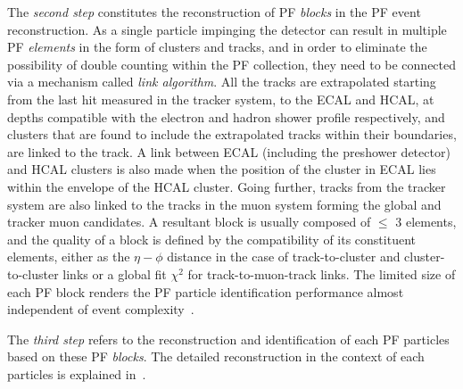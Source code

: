 The \emph{second step} constitutes the reconstruction of PF \emph{blocks} in the PF event reconstruction. As a single particle impinging the detector
can result in multiple PF \emph{elements} in the form of clusters and tracks, and in order to eliminate the possibility of double counting 
within the PF collection, they need to be connected via a mechanism called \emph{link algorithm}. All the tracks are extrapolated starting
from the last hit measured in the tracker system, to the ECAL and HCAL, at depths compatible with the electron and hadron shower profile
respectively, and clusters that are found to include the extrapolated tracks within their boundaries, are linked to the track. 
A link between ECAL (including the preshower detector) and HCAL clusters is also made when the position of the cluster in ECAL lies within
the envelope of the HCAL cluster. Going further, tracks from the tracker system are also linked to the tracks in the muon system forming the 
global and tracker muon candidates. A resultant block is usually composed of $\le$ 3 elements, and the quality of a block is defined by 
the compatibility of its constituent elements, either as the $\eta-\phi$ distance in the case of track-to-cluster and cluster-to-cluster links or 
a global fit $\chi^{2}$ for track-to-muon-track links. The limited size of each PF block renders the PF particle identification performance almost 
independent of event complexity~\cite{CMS-PAS-PFT-09-001}.

The \emph{third step} refers to the reconstruction and identification of each PF particles based on these PF \emph{blocks}.
The detailed reconstruction in the context of each particles is explained in~\cite{CMS-PAS-PFT-09-001}.

